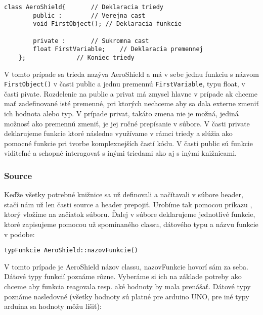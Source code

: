 \begin{lstlisting}[caption={Triedy a objekty.},captionpos=b]
	class AeroShield{		// Deklaracia triedy
		public :		// Verejna cast
		void FirstObject();	// Deklaracia funkcie
		
		private :		// Sukromna cast
		float FirstVariable;	// Deklaracia premennej
	};				// Koniec triedy
\end{lstlisting}

V tomto prípade sa trieda nazýva AeroShield a má v sebe jednu funkciu s názvom \verb|FirstObject()| v časti public a jednu premennú \verb|FirstVariable|, typu float, v časti pivate. Rozdelenie na public a privat má zmysel hlavne v prípade ak chceme mať zadefinované isté premenné, pri ktorých nechceme aby sa dala externe zmeniť ich hodnota alebo typ. V prípade privat, takáto zmena nie je možná, jediná možnosť ako premennú zmeniť, je jej ručné prepísanie v súbore. V časti private deklarujeme funkcie ktoré následne využívame v rámci triedy a slúžia ako pomocné funkcie pri tvorbe komplexnejších častí kódu. V časti public sú funkcie viditeľné a schopné interagovať s inými triedami ako aj s inými knižnicami. 

\newpage
\subsubsection{Source}

Keďže všetky potrebné knižnice sa už definovali a načítavali v súbore header, stačí nám už len časti source a header prepojiť. Urobíme tak pomocou príkazu , ktorý vložíme na začiatok súboru. Ďalej v súbore deklarujeme jednotlivé funkcie, ktoré zapisujeme pomocou už spomínaného classu, dátového typu a názvu funkcie v podobe:

\begin{lstlisting}[caption={Source volanie funkcie.},captionpos=b]
typFunkcie AeroShield::nazovFunkcie()
\end{lstlisting}

V tomto prípade je AeroShield názov classu, nazovFunkcie hovorí sám za seba. Dátové typy funkcií poznáme rôzne. Vyberáme si ich na základe potreby ako chceme aby funkcia reagovala resp. aké hodnoty by mala prenášať. Dátové typy poznáme nasledovné\cite{datovetypy} (všetky hodnoty sú platné pre arduino UNO, pre iné typy arduina sa hodnoty môžu líšiť): 

